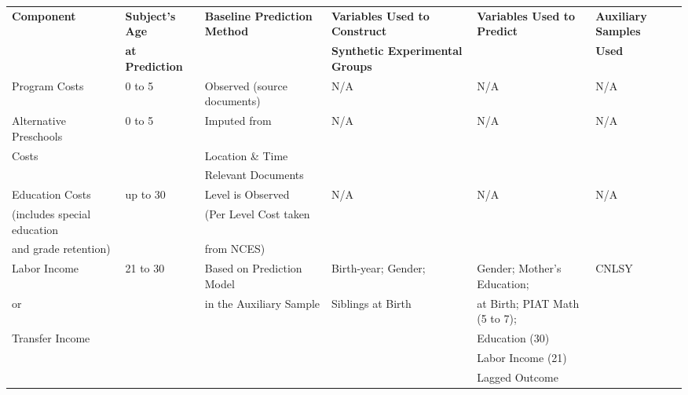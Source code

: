 \begin{tabular}{llllll} \toprule
    \textbf{Component} & \textbf{Subject's Age} & \textbf{Baseline Prediction Method} & \textbf{Variables Used to Construct}     & \textbf{Variables Used to Predict} & \textbf{Auxiliary Samples} \\ 
                    &   \textbf{at Prediction} &                                              & \textbf{Synthetic Experimental Groups}  &                                          & \textbf{Used}                         \\ \midrule 
Program Costs             & 0 to 5      & Observed (source documents)      & N/A & N/A & N/A \\ \midrule
Alternative Preschools & 0 to 5      & Imputed from  & N/A & N/A & N/A \\  
Costs                           &                & Location \& Time & & & \\
                                    &                & Relevant Documents & & & \\ \midrule
Education Costs                       & up to 30  & Level is Observed                        & N/A & N/A & N/A \\ 
(includes special education     &                & (Per Level Cost taken             &       &        &        \\
and grade retention)                & & from NCES) & & & \\ \midrule 

Labor Income       & 21 to 30 & Based on Prediction Model     & Birth-year; Gender;   & Gender; Mother's Education; & CNLSY \\
or                          &               & in the Auxiliary Sample            & Siblings at Birth     & at Birth; PIAT Math (5 to 7);   &              \\  
Transfer Income   &               &                                                  &                             & Education (30)                       &              \\ 
                       &               &                                                  &                                   & Labor Income (21)                 &              \\                        
                       &               &                                                  &                                   & Lagged Outcome            &              \\ \midrule


\end{tabular}

